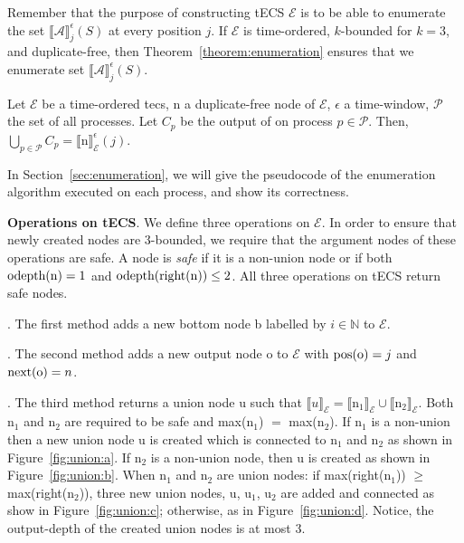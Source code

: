 Remember that the purpose of constructing tECS $\mathcal{E}$ is to be able to enumerate the set ${\llbracket \mathcal{A} \rrbracket}^{\epsilon}_{j}(S)$ at every position $j$. If $\mathcal{E}$ is time-ordered, $k$-bounded for $k = 3$, and duplicate-free, then Theorem~\ref{theorem:enumeration} ensures that we enumerate set ${\llbracket \mathcal{A} \rrbracket}^{\epsilon}_{j}(S)$.
\begin{theorem}\label{theorem:enumeration}
  Let $\mathcal{E}$ be a time-ordered \acrshort{tecs}, \textrm{n} a duplicate-free node of $\mathcal{E}$, $\epsilon$ a time-window, $\mathcal{P}$ the set of all processes. Let $C_{p}$ be the output of  on process $p \in \mathcal{P}$. Then, $\bigcup\limits_{p \in \mathcal{P}} C_{p} = {\llbracket \text{n} \rrbracket}^{\epsilon}_{\mathcal{E}}(j)$.
\end{theorem}

In Section~\ref{sec:enumeration}, we will give the pseudocode of the enumeration algorithm executed on each process, and show its correctness.

\textbf{Operations on tECS}. We define three operations on $\mathcal{E}$. In order to ensure that newly created nodes are $3$-bounded, we require that the argument nodes of these operations are safe. A node is \emph{safe} if it is a non-union node or if both $\text{odepth(\textrm{n})} = 1$ and $\text{odepth(right(\textrm{n}))} \le 2$. All three operations on tECS return safe nodes.

. The first method adds a new bottom node \textrm{b} labelled by $i \in \mathbb{N}$ to $\mathcal{E}$.

. The second method adds a new output node \textrm{o} to $\mathcal{E}$ with $\text{pos(\textrm{o})} = j$ and $\text{next(\textrm{o})} = n$.

. The third method returns a union node \textrm{u} such that ${\llbracket u \rrbracket}_{\mathcal{E}} = {\llbracket \textrm{n}_{1} \rrbracket}_{\mathcal{E}} \cup {\llbracket \textrm{n}_{2} \rrbracket}_{\mathcal{E}}$. Both $\textrm{n}_{1}$ and $\textrm{n}_{2}$ are required to be safe and max($\textrm{n}_{1}$) $=$ max($\textrm{n}_{2}$). If $\textrm{n}_{1}$ is a non-union then a new union node \textrm{u} is created which is connected to $\textrm{n}_{1}$ and $\textrm{n}_{2}$ as shown in Figure~\ref{fig:union:a}. If $\textrm{n}_{2}$ is a non-union node, then \textrm{u} is created as shown in Figure~\ref{fig:union:b}. When $\textrm{n}_{1}$ and $\textrm{n}_{2}$ are union nodes: if max(right($\textrm{n}_{1}$)) $\ge$ max(right($\textrm{n}_{2}$)), three new union nodes, \textrm{u}, $\textrm{u}_{1}$, $\textrm{u}_{2}$ are added and connected as show in Figure~\ref{fig:union:c}; otherwise, as in Figure~\ref{fig:union:d}. Notice, the output-depth  of the created union nodes is at most 3.

